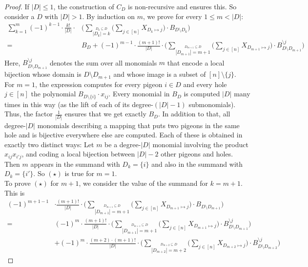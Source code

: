 \documentclass[a4paper,UKenglish,cleveref, autoref, thm-restate]{lipics-v2021}
\begin{document}
\begin{proof}
	If $|D| \leq 1$, the construction of $C_D$ is non-recursive and ensures this. So consider a $D$ with $|D| > 1$. By induction on $m$, we prove for every $1 \leq m < |D|$:
	\begin{align*}
		\sum_{k=1}^{m} (-1)^{k-1} \cdot \frac{k!}{|D|} \cdot &\Big(\sum_{\stackrel{D_k \subseteq D}{|D_k| = k}} \Big(\sum_{j \in [n]} X_{D_k \mapsto j}\Big) \cdot B_{D \setminus D_k} \Big)\\
		=& B_D + (-1)^{m-1} \cdot \frac{(m+1)!}{|D|} \cdot \Big(\sum_{\stackrel{D_{m+1} \subseteq D}{|D_{m+1}| = m+1}} \Big(\sum_{j \in [n]} X_{D_{m+1} \mapsto j}\Big) \cdot B^{\setminus j}_{D \setminus D_{m+1}} \Big) \tag{$\star$}
	\end{align*}	
	Here, $B^{\setminus j}_{D \setminus D_{m+1}}$ denotes the sum over all monomials $m$ that encode a local bijection whose domain is $D \setminus D_{m+1}$ and whose image is a subset of $[n] \setminus \{j\}$.\\
	For $m = 1$, the expression computes for every pigeon $i \in D$ and every hole $j \in [n]$ the polynomial $B_{D \setminus \{i\}} \cdot x_{ij}$. Every monomial in $B_D$ is computed $|D|$ many times in this way (as the lift of each of its degree-$(|D|-1)$ submonomials). Thus, the factor $\frac{1}{|D|}$ ensures that we get exactly $B_D$. In addition to that, all degree-$|D|$ monomials describing a mapping that puts two pigeons in the same hole and is bijective everywhere else are computed. Each of these is obtained in exactly two distinct ways: Let $m$ be a degree-$|D|$ monomial involving the product $x_{ij}x_{i'j}$, and coding a local bijection between $|D|-2$ other pigeons and holes. Then $m$ appears in the summand with $D_k = \{i\}$ and also in the summand with $D_k = \{i'\}$. So $(\star)$ is true for $m = 1$.\\
	To prove $(\star)$ for $m+1$, we consider the value of the summand for $k = m+1$. This is
	\begin{align*}
		(-1)^{m+1-1} &\cdot \frac{(m+1)!}{|D|} \cdot \Big(\sum_{\stackrel{D_{m+1} \subseteq D}{|D_{m+1}| = m+1}} \Big(\sum_{j \in [n]} X_{D_{m+1} \mapsto j}\Big) \cdot B_{D \setminus D_{m+1}} \Big)\\
		=& 	(-1)^{m} \cdot \frac{(m+1)!}{|D|} \cdot \Big(\sum_{\stackrel{D_{m+1} \subseteq D}{|D_{m+1}| = m+1}} \Big(\sum_{j \in [n]} X_{D_{m+1} \mapsto j}\Big) \cdot B^{\setminus j}_{D \setminus D_{m+1}} \Big)\\
		&+ (-1)^{m} \cdot \frac{(m+2) \cdot (m+1)!}{|D|} \cdot \Big(\sum_{\stackrel{D_{m+2} \subseteq D}{|D_{m+2}| = m+2}} \Big(\sum_{j \in [n]} X_{D_{m+2} \mapsto j}\Big) \cdot B^{\setminus j}_{D \setminus D_{m+2}} \Big)

\end{align*}
\end{proof}
\end{document}
